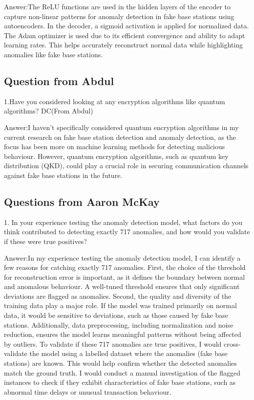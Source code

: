 Answer:The ReLU  functions are used in the hidden layers of the encoder to capture non-linear patterns for anomaly detection in fake base stations using autoencoders. In the decoder, a sigmoid activation is  applied for normalized data. The Adam optimizer is  used due to its efficient convergence and ability to adapt learning rates. This helps  accurately reconstruct normal data while highlighting anomalies like fake base stations.

\subsection{Question from Abdul}

1.Have you considered looking at any encryption algorithms like quantum algorithms? DC(From Abdul)

Answer:I haven't specifically considered quantum encryption algorithms in my current research on fake base station detection and anomaly detection, as the focus has been more on machine learning methods for detecting malicious behaviour. However, quantum encryption algorithms, such as quantum key distribution (QKD), could play a crucial role in securing communication channels against fake base stations in the future. 

\subsection{Questions from Aaron McKay}
1. In your experience testing the anomaly detection model, what factors do you think contributed to detecting exactly 717 anomalies, and how would you validate if these were true positives?

Answer:In my experience testing the anomaly detection model, I can identify a few reasons for catching exactly 717 anomalies. First, the choice of the threshold for reconstruction error is important, as it defines the boundary between normal and anomalous behaviour. A well-tuned threshold ensures that only significant deviations are flagged as anomalies. Second, the quality and diversity of the training data play a major role. If the model was trained primarily on normal data, it would be sensitive to deviations, such as those caused by fake base stations. Additionally, data preprocessing, including normalization and noise reduction, ensures the model learns meaningful patterns without being affected by outliers.
To validate if these 717 anomalies are true positives, I would cross-validate the model using a labelled dataset where the anomalies (fake base stations) are known. This would help confirm whether the detected anomalies match the ground truth. I would conduct a manual investigation of the flagged instances to check if they exhibit characteristics of fake base stations, such as abnormal time delays or unusual transaction behaviour.

